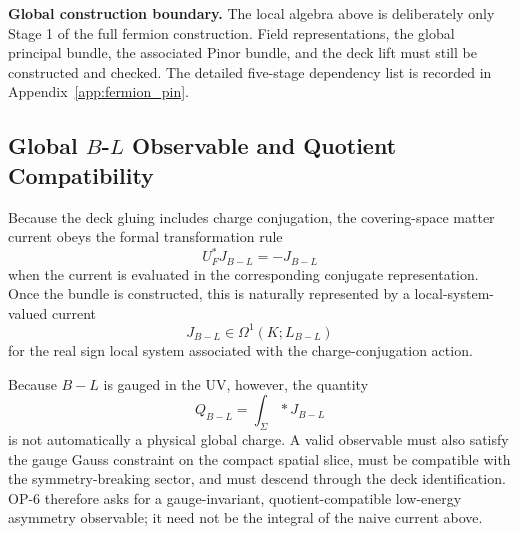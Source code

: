 \documentclass[11pt]{article}
\theoremstyle{canonmath}
\theoremstyle{canonpostulate}
\theoremstyle{canonclaim}
\providecommand{\Klein}{\mathcal{K}}
\def\mathcal#1{#1}%
\begin{document}
\begin{keyresult}
\textbf{Global construction boundary.} The local algebra above is deliberately only Stage 1 of the full fermion construction. Field representations, the global principal bundle, the associated Pinor bundle, and the deck lift must still be constructed and checked. The detailed five-stage dependency list is recorded in Appendix~\ref{app:fermion_pin}.
\end{keyresult}

\subsection{Global \texorpdfstring{$B$-$L$}{B-L} Observable and Quotient Compatibility}

Because the deck gluing includes charge conjugation, the covering-space matter current obeys the formal transformation rule
\begin{equation}
U_F^*J_{B-L}=-J_{B-L}
\end{equation}
when the current is evaluated in the corresponding conjugate representation. Once the bundle is constructed, this is naturally represented by a local-system-valued current
\begin{equation}
J_{B-L}\in\Omega^1(\Klein;\mathcal L_{B-L})
\end{equation}
for the real sign local system associated with the charge-conjugation action.

Because $B-L$ is gauged in the UV, however, the quantity
\begin{equation}
Q_{B-L}=\int_{\Sigma}*J_{B-L}
\end{equation}
is not automatically a physical global charge. A valid observable must also satisfy the gauge Gauss constraint on the compact spatial slice, must be compatible with the symmetry-breaking sector, and must descend through the deck identification. OP-6 therefore asks for a gauge-invariant, quotient-compatible low-energy asymmetry observable; it need not be the integral of the naive current above.
\end{document}
